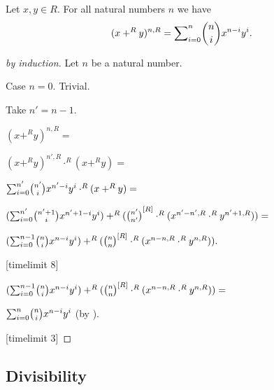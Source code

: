 \documentclass[11pt]{article}
\begin{document}
\begin{forthel}
\begin{theorem}
Let $x,y \in R$. For all natural numbers $n$ we have
$$(x +^{R} y)^{n,R} = \binsum{n}{n}{x}{y}{R}.$$
\end{theorem}
\begin{proof}[by induction]
Let $n$ be a natural number.

Case $n = 0$. Trivial.

Take $n' = n-1$.

$(x +^{R} y)^{n,R} =$

$(x +^{R} y)^{n',R} \cdot^{R} (x +^{R} y) =$

$\binsum{n'}{n'}{x}{y}{R} \cdot^{R} (x +^{R} y) =$

$(\binsum{n'}{n'+1}{x}{y}{R}) +^{R} (\cho{n'}{n'}^{[R]} \cdot^{R} (x^{n'-n',R} \cdot^{R} y^{n'+1,R})) =$

$(\binsum{n-1}{n}{x}{y}{R}) +^{R} (\cho{n}{n}^{[R]} \cdot^{R} (x^{n-n,R} \cdot^{R} y^{n,R})).$

[timelimit 8]


$(\binsum{n-1}{n}{x}{y}{R}) +^{R} (\cho{n}{n}^{[R]} \cdot^{R} (x^{n-n,R} \cdot^{R} y^{n,R})) =$

$\binsum{n}{n}{x}{y}{R}$ (by ).

[timelimit 3]

\end{proof}

\end{forthel}

\subsection{Divisibility} 
\end{document}
